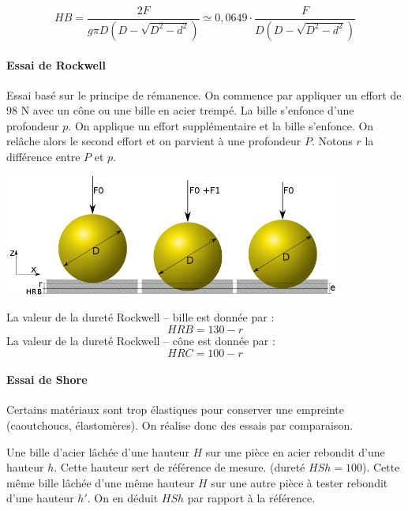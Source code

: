 \documentclass[11pt,oneside]{article}
\begin{document}
\vspace{.5cm}

\begin{resultat}
$$
HB =
 \dfrac{2F}{g\pi D\left( D-\sqrt{D^2-d^2}\right)}
\simeq
0,0649\cdot \dfrac{F}{ D\left( D-\sqrt{D^2-d^2}\right)}
$$
\end{resultat}

\paragraph*{Essai de Rockwell}

Essai basé sur le principe de rémanence. On commence par appliquer un effort de 98 N avec un cône ou une bille en acier trempé. La bille s'enfonce d'une profondeur $p$. On applique un effort supplémentaire et la bille s'enfonce. On relâche alors le second effort et on parvient à une profondeur $P$. Notons $r$ la différence entre $P$ et $p$. 

\begin{center}
\includegraphics[height=4cm]{png/rockwell}
\end{center}

\begin{resultat}
La valeur de la dureté Rockwell -- bille est donnée par :
$$
HRB = 130 -r
$$
La valeur de la dureté Rockwell -- cône est donnée par :
$$
HRC = 100 -r
$$
\end{resultat}



\paragraph*{Essai de Shore \cite{jb}}

Certains matériaux sont trop élastiques pour conserver une empreinte (caoutchoucs, élastomères). On réalise donc des essais par comparaison. 

Une bille d'acier lâchée d'une hauteur $H$ sur une pièce en acier rebondit d'une hauteur $h$. Cette hauteur sert de référence de mesure. (dureté $HSh = 100$). Cette même bille lâchée d'une même hauteur $H$ sur une autre pièce à tester rebondit d'une hauteur $h'$. On en déduit $HSh$ par rapport à la référence. 
\end{document}
